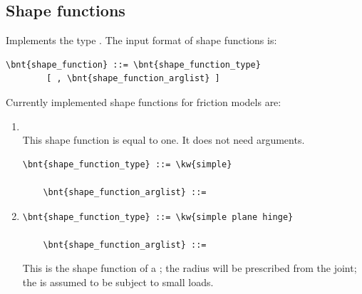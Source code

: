 \subsection{Shape functions}
\label{sec:Shape}
Implements the type .
The input format of shape functions is:
\begin{Verbatim}[commandchars=\\\{\}]
    \bnt{shape_function} ::= \bnt{shape_function_type}
        [ , \bnt{shape_function_arglist} ]
\end{Verbatim}
Currently implemented shape functions for friction models are:
\begin{enumerate}
    \item {}\\
    This shape function is equal to one. It does not need arguments.
\begin{Verbatim}[commandchars=\\\{\}]
    \bnt{shape_function_type} ::= \kw{simple}

    \bnt{shape_function_arglist} ::=
\end{Verbatim}

    \item {}
\begin{Verbatim}[commandchars=\\\{\}]
    \bnt{shape_function_type} ::= \kw{simple plane hinge}

    \bnt{shape_function_arglist} ::= 
\end{Verbatim}
    This is the shape function of a ; the radius will be prescribed from the
    joint; the  is assumed to be subject to small loads.
\end{enumerate}



